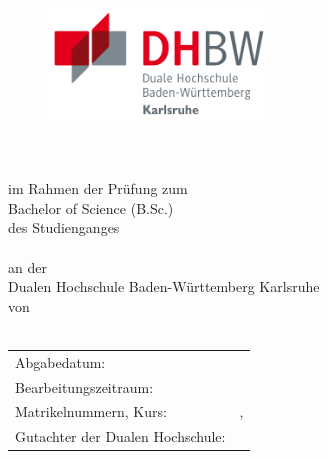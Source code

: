 \thispagestyle{empty}
\begin{titlepage}
\enlargethispage{4cm}

\begin{figure}           %
	 \vspace*{-10mm} %

	\begin{minipage}{0.49\textwidth}
		\flushleft
		\includegraphics[height=3cm]{Bilder/Logos/Logo_DHBW.pdf} 
	\end{minipage}
	\hfill
\end{figure} 
\vspace*{0.2cm}

\begin{center}
	\huge{\textbf{\titel}}\\[1cm]
	\Large{\textbf{\arbeit}}\\[0.5cm]
	\normalsize{im Rahmen der Prüfung zum} \\[0.2cm] 
	\Large{Bachelor of Science (B.Sc.)}\\[0.2cm]
	\normalsize{des Studienganges} \\ [0.2cm]
	\Large{\studiengang}\\[1ex]
	\normalsize{an der} \\ [0.2cm]
	\Large{Dualen Hochschule Baden-Württemberg Karlsruhe}\\[0.2cm]
	\normalsize{von}\\[0.5cm] \Large{\textbf{\autor}} \\
\end{center}

\begin{center}
	\vfill
	\begin{tabular}{ll}
		Abgabedatum:                     & \abgabe \\[0.2cm]
		Bearbeitungszeitraum:            & \bearbeitungszeitraum \\ [0.2cm]
		Matrikelnummern, Kurs:            & \matrikelnr , \kurs \\[0.2cm]
		Gutachter der Dualen Hochschule: & \betreuerDhbw \\[2cm]
	\end{tabular} 
\end{center}
\end{titlepage}
